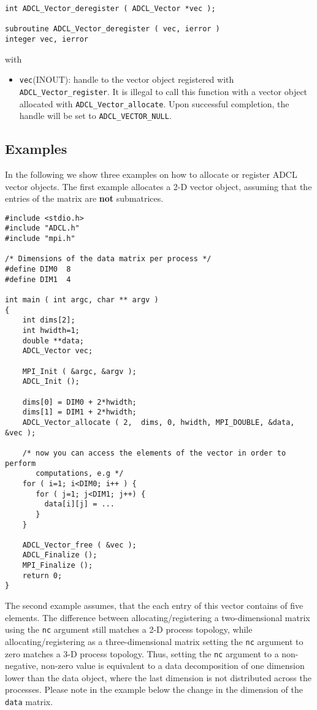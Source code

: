 \begin{verbatim}
int ADCL_Vector_deregister ( ADCL_Vector *vec );

subroutine ADCL_Vector_deregister ( vec, ierror )
integer vec, ierror
\end{verbatim}
with
\begin{itemize}
\item {\tt vec}(INOUT): handle to the vector object registered with {\tt ADCL\_Vector\-\_register}. It is illegal to call 
 this function with a vector object allocated with {\tt ADCL\_Vector\_allocate}. Upon successful completion, the handle will be set to {\tt ADCL\_VECTOR\_NULL}.
\end{itemize}

\subsection{Examples}
In the following we show three examples on how to allocate or register ADCL vector objects. The first example allocates a 2-D vector object, assuming that the entries of the matrix are {\bf not } submatrices.

\begin{verbatim}
#include <stdio.h>
#include "ADCL.h"
#include "mpi.h"

/* Dimensions of the data matrix per process */
#define DIM0  8
#define DIM1  4

int main ( int argc, char ** argv ) 
{
    int dims[2];
    int hwidth=1;
    double **data;
    ADCL_Vector vec;
    
    MPI_Init ( &argc, &argv );
    ADCL_Init ();
    
    dims[0] = DIM0 + 2*hwidth;
    dims[1] = DIM1 + 2*hwidth;
    ADCL_Vector_allocate ( 2,  dims, 0, hwidth, MPI_DOUBLE, &data, &vec );
    
    /* now you can access the elements of the vector in order to perform 
       computations, e.g */
    for ( i=1; i<DIM0; i++ ) {
       for ( j=1; j<DIM1; j++) {
         data[i][j] = ...
       }
    }
    
    ADCL_Vector_free ( &vec );        
    ADCL_Finalize ();
    MPI_Finalize ();
    return 0;
}
\end{verbatim}

The second example assumes, that the each entry of this vector contains of five elements. The difference between 
allocating/registering a two-dimensional matrix using the {\tt nc} argument still matches a 2-D process topology, while allocating/registering as a three-dimensional matrix setting the {\tt nc} argument to zero matches a 3-D process topology. Thus, setting the {\tt nc} argument  to a non-negative, non-zero value is equivalent to a data decomposition of one dimension lower than the data object, where the last dimension is not distributed across the processes. Please note in the example below the change in the dimension of the {\tt data} matrix.

